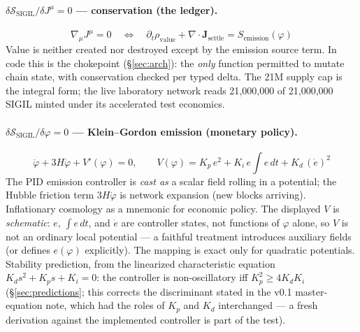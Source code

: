 \documentclass[10pt,a4paper]{article}
\newcommand{\SSIGIL}{\mathcal{S}_{\mathrm{SIGIL}}}
\begin{document}
\paragraph{$\delta\SSIGIL/\delta J^\mu = 0$ — conservation (the ledger).}
\begin{equation}
\nabla_\mu J^\mu = 0 \quad\Longleftrightarrow\quad
\partial_t \rho_{\mathrm{value}} + \nabla\!\cdot\!\mathbf{J}_{\mathrm{settle}}
= S_{\mathrm{emission}}(\varphi)
\end{equation}
Value is neither created nor destroyed except by the emission source term. In code this
is the  chokepoint (\S\ref{sec:arch}): the \emph{only}
function permitted to mutate chain state, with conservation checked per typed delta.
The 21M supply cap is the integral form; the live laboratory network reads 21{,}000{,}000
of 21{,}000{,}000 SIGIL minted under its accelerated test economics.

\paragraph{$\delta\SSIGIL/\delta\varphi = 0$ — Klein–Gordon emission (monetary policy).}
\begin{equation}
\ddot{\varphi} + 3H\dot{\varphi} + V'(\varphi) = 0,\qquad
V(\varphi) = K_p\,e^2 + K_i\,e\!\!\int\! e\,dt + K_d\,(\dot e)^2
\end{equation}
The PID emission controller is \emph{cast as} a scalar field rolling in a potential;
the Hubble friction term $3H\dot\varphi$ is network expansion (new blocks arriving).
Inflationary cosmology as a mnemonic for economic policy. The displayed $V$ is
\emph{schematic}: $e$, $\int e\,dt$, and $\dot e$ are controller states, not functions
of $\varphi$ alone, so $V$ is not an ordinary local potential — a faithful treatment
introduces auxiliary fields (or defines $e(\varphi)$ explicitly). The mapping is exact
only for quadratic potentials. Stability prediction, from the linearized characteristic
equation $K_d s^2 + K_p s + K_i = 0$: the controller is non-oscillatory iff
$K_p^2 \ge 4K_dK_i$ (\S\ref{sec:predictions}; this corrects the discriminant stated in
the v0.1 master-equation note, which had the roles of $K_p$ and $K_d$ interchanged — a
fresh derivation against the implemented controller is part of the test).
\end{document}
